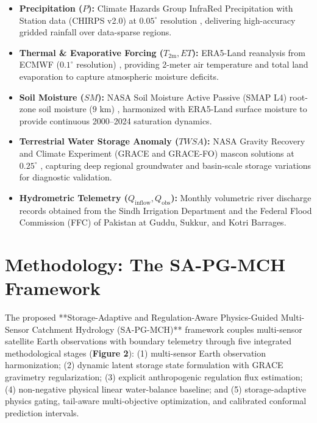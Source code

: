 \documentclass[11pt,a4paper,fleqn]{article}
\begin{document}
\begin{itemize}
    \item \textbf{Precipitation ($P$):} Climate Hazards Group InfraRed Precipitation with Station data (CHIRPS v2.0) at $0.05^\circ$ resolution \citep{funk2015climate}, delivering high-accuracy gridded rainfall over data-sparse regions.
    \item \textbf{Thermal & Evaporative Forcing ($T_{\text{2m}}, ET$):} ERA5-Land reanalysis from ECMWF ($0.1^\circ$ resolution) \citep{munoz2021era5}, providing 2-meter air temperature and total land evaporation to capture atmospheric moisture deficits.
    \item \textbf{Soil Moisture ($SM$):} NASA Soil Moisture Active Passive (SMAP L4) root-zone soil moisture ($9\text{ km}$) \citep{entekhabi2010soil}, harmonized with ERA5-Land surface moisture to provide continuous 2000--2024 saturation dynamics.
    \item \textbf{Terrestrial Water Storage Anomaly ($TWSA$):} NASA Gravity Recovery and Climate Experiment (GRACE and GRACE-FO) mascon solutions at $0.25^\circ$ \citep{tapley2019contributions, rodell2018emerging}, capturing deep regional groundwater and basin-scale storage variations for diagnostic validation.
    \item \textbf{Hydrometric Telemetry ($Q_{\text{inflow}}, Q_{\text{obs}}$):} Monthly volumetric river discharge records obtained from the Sindh Irrigation Department and the Federal Flood Commission (FFC) of Pakistan at Guddu, Sukkur, and Kotri Barrages.
\end{itemize}


\section{Methodology: The SA-PG-MCH Framework}

The proposed **Storage-Adaptive and Regulation-Aware Physics-Guided Multi-Sensor Catchment Hydrology (SA-PG-MCH)** framework couples multi-sensor satellite Earth observations with boundary telemetry through five integrated methodological stages (\textbf{Figure 2}): (1) multi-sensor Earth observation harmonization; (2) dynamic latent storage state formulation with GRACE gravimetry regularization; (3) explicit anthropogenic regulation flux estimation; (4) non-negative physical linear water-balance baseline; and (5) storage-adaptive physics gating, tail-aware multi-objective optimization, and calibrated conformal prediction intervals.
\end{document}
